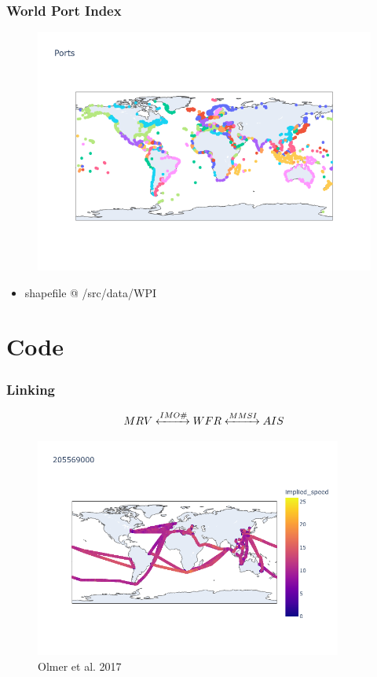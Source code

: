 \documentclass{beamer}
\begin{document}
\begin{frame}
\frametitle{World Port Index}

\begin{figure}
    \includegraphics[width = \textwidth]{WPI.png}
\end{figure}

\begin{itemize}
    \item shapefile @ /src/data/WPI
\end{itemize}

\end{frame}


\section{Code}


\begin{frame}
\frametitle{Linking}

$$ MRV \xleftrightarrow{IMO \#} WFR \xleftrightarrow{MMSI} AIS $$

\begin{figure}
    \includegraphics[width = 0.9\textwidth]{205569000_implied_speed.png}
    \caption{Olmer et al. 2017}
\end{figure}

\end{frame}
\end{document}
